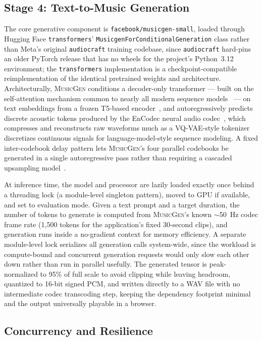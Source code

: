 \documentclass[11pt]{article}
\newcommand{\musicgen}{\textsc{MusicGen}}
\begin{document}
\subsection{Stage 4: Text-to-Music Generation}

The core generative component is \texttt{facebook/musicgen-small}, loaded through Hugging Face \texttt{transformers}' \texttt{MusicgenForConditionalGeneration} class rather than Meta's original \texttt{audiocraft} training codebase, since \texttt{audiocraft} hard-pins an older PyTorch release that has no wheels for the project's Python~3.12 environment; the \texttt{transformers} implementation is a checkpoint-compatible reimplementation of the identical pretrained weights and architecture. Architecturally, \musicgen{} conditions a decoder-only transformer --- built on the self-attention mechanism common to nearly all modern sequence models~\cite{vaswani2017attention} --- on text embeddings from a frozen T5-based encoder~\cite{raffel2020t5}, and autoregressively predicts discrete acoustic tokens produced by the EnCodec neural audio codec~\cite{defossez2022encodec}, which compresses and reconstructs raw waveforms much as a VQ-VAE-style tokenizer~\cite{oord2017vqvae} discretizes continuous signals for language-model-style sequence modeling. A fixed inter-codebook delay pattern lets \musicgen{}'s four parallel codebooks be generated in a single autoregressive pass rather than requiring a cascaded upsampling model~\cite{copet2023musicgen}.

At inference time, the model and processor are lazily loaded exactly once behind a threading lock (a module-level singleton pattern), moved to GPU if available, and set to evaluation mode. Given a text prompt and a target duration, the number of tokens to generate is computed from \musicgen{}'s known $\sim$50~Hz codec frame rate (1{,}500 tokens for the application's fixed 30-second clips), and generation runs inside a no-gradient context for memory efficiency. A separate module-level lock serializes all generation calls system-wide, since the workload is compute-bound and concurrent generation requests would only slow each other down rather than run in parallel usefully. The generated tensor is peak-normalized to 95\% of full scale to avoid clipping while leaving headroom, quantized to 16-bit signed PCM, and written directly to a WAV file with no intermediate codec transcoding step, keeping the dependency footprint minimal and the output universally playable in a browser.

\subsection{Concurrency and Resilience}
\end{document}
